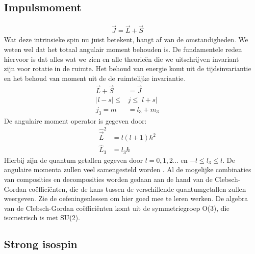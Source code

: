 \documentclass[../main.tex]{subfiles}
\begin{document}
\subsection{Impulsmoment}%
\label{sub:impuls_moment}

\begin{equation}
    \begin{aligned}
        \label{eq:impuls_moment}
        \vec{J}=\vec{L}+\vec{S}
    \end{aligned}
\end{equation}
Wat deze intrinsieke spin nu juist betekent, hangt af van de omstandigheden. We weten wel dat het totaal angulair moment behouden is. De fundamentele reden hiervoor is dat alles wat we zien en alle theorieën die we uitschrijven invariant zijn voor rotatie in de ruimte. Het behoud van energie komt uit de tijdsinvariantie en het behoud van moment uit de de ruimtelijke invariantie.\\
\begin{equation}
    \begin{aligned}
        \label{eq:samengesteld_moment}
        \vec{L} + \vec{S} &= \vec{J}\\
        |l-s| \leq &j \leq |l+s|\\
        j_3=m&=l_3+m_3
    \end{aligned}
\end{equation}
De angulaire moment operator is gegeven door:
\begin{equation}
    \begin{aligned}
        \label{eq:ang_mom_op}
        \hat{\vec{L}}^2&=l(l+1)\hbar^2\\
        \hat{L}_3&=l_3\hbar
    \end{aligned}
\end{equation}
Hierbij zijn de quantum getallen gegeven door $l=0,1,2...$ en $-l\leq l_3\leq l$. De angulaire momenta zullen veel samengesteld worden . Al de mogelijke combinaties van composities en decomposities worden gedaan aan de hand van de Clebsch-Gordan coëfficiënten, die de kans tussen de verschillende quantumgetallen zullen weergeven. Zie de oefeningenlessen om hier goed mee te leren werken. De algebra van de Clebsch-Gordan coëfficiënten komt uit de symmetriegroep O(3), die isometrisch is met SU(2). 

\subsection{Strong isospin}%
\label{sub:strong_isospin}
\end{document}
